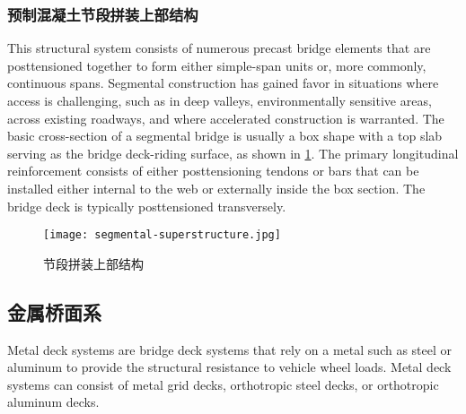 \subsubsection{预制混凝土节段拼装上部结构}
This structural system consists of numerous precast bridge elements that are posttensioned together to form either simple-span units or, more commonly, continuous spans. Segmental construction has gained favor in situations where access is challenging, such as in deep valleys, environmentally sensitive areas, across existing roadways, and where accelerated construction is warranted. The basic cross-section of a segmental bridge is usually a box shape with a top slab serving as the bridge deck-riding surface, as shown in \cref{fig:segmental-superstructure}. The primary longitudinal reinforcement consists of either posttensioning tendons or bars that can be installed either internal to the web or externally inside the box section. The bridge deck is typically posttensioned transversely.

\begin{figure}
  \texttt{[image: segmental-superstructure.jpg]}
  \caption{节段拼装上部结构}
  \label{fig:segmental-superstructure}
\end{figure}

\subsection{金属桥面系}
Metal deck systems are bridge deck systems that rely on a metal such as steel or aluminum to provide the structural resistance to vehicle wheel loads. Metal deck systems can consist of metal grid decks, orthotropic steel decks, or orthotropic aluminum decks.

